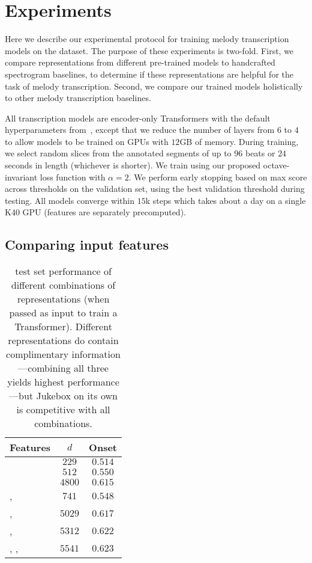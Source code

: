 \section{Experiments}
\label{sec:experiments}

Here we describe our experimental protocol for training melody transcription models on the \hooktheory{} dataset. 
The purpose of these experiments is two-fold. 
First, we compare representations from different pre-trained models to handcrafted spectrogram baselines, to determine if these representations are helpful for the task of melody transcription.  
Second, we compare our trained models holistically to other melody transcription baselines. 

All transcription models are encoder-only Transformers with the default hyperparameters from~\cite{vaswani2017attention}, 
except that we reduce the number of layers from $6$ to $4$ to allow models to be trained on GPUs with $12$GB of memory. 
During training, we select random slices from the annotated segments of up to $96$ beats or $24$ seconds in length (whichever is shorter). 
We train using our proposed octave-invariant loss function with $\alpha = 2$. 
We perform early stopping based on max \fone{} score across thresholds on the validation set, using the best validation threshold during testing. 
All models converge within $15$k steps which takes about a day on a single K40 GPU (features are separately precomputed). 

\subsection{Comparing input features}
\label{sec:exp1}

\begin{table}[t]
    \centering
    \begin{tabular}{lcc}
\toprule
Features & $d$ & Onset \fone{} \\
\midrule
\mel{} & $229$ & $0.514$ \\
\mtthree{} & $512$ & $0.550$ \\
\jukebox{} & $4800$ & $0.615$ \\
\mel{}, \mtthree{} & $741$ & $0.548$ \\
\mel{}, \jukebox{} & $5029$ & $0.617$ \\
\mtthree{}, \jukebox{} & $5312$ & $0.622$ \\
\mel{}, \mtthree{}, \jukebox{} & $5541$ & $\mathbf{0.623}$ \\
\bottomrule
    \end{tabular}
    \caption{\hooktheory{} test set performance of different combinations of representations (when passed as input to train a Transformer). Different representations do contain complimentary information---combining all three yields highest performance---but Jukebox on its own is competitive with all combinations.}
    \label{tab:hooktheory_test}
\end{table}

